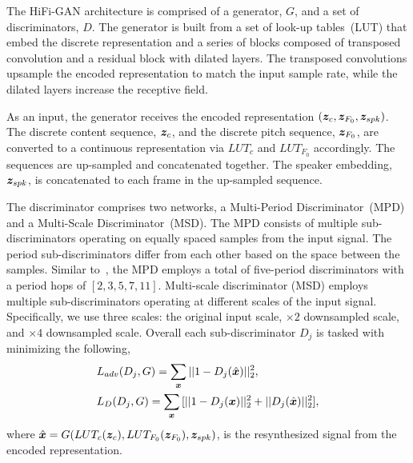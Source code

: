 The HiFi-GAN architecture is comprised of a generator, $G$, and a set of discriminators, $D$. The generator is built from a set of look-up tables~(LUT) that embed the discrete representation and a series of blocks composed of transposed convolution and a residual block with dilated layers. The transposed convolutions upsample the encoded representation to match the input sample rate, while the dilated layers increase the 
receptive field. 

As an input, the generator receives the encoded representation $(\bm{z}_c, \bm{z}_{F_0}, \bm{z}_{spk})$. The discrete content sequence, $\bm{z}_c$, and the discrete pitch sequence, $\bm{z}_{F_0}$, are converted to a continuous representation via $LUT_{c}$ and $LUT_{F_0}$ accordingly. The sequences are up-sampled and concatenated together. The speaker embedding, $\bm{z}_{spk}$, is concatenated to each frame in the up-sampled sequence.  

The discriminator comprises two networks, a Multi-Period Discriminator~(MPD) and a Multi-Scale Discriminator~(MSD). The MPD consists of multiple sub-discriminators operating on equally spaced samples from the input signal. The period sub-discriminators differ from each other based on the space between the samples. Similar to~\cite{kong2020hifi}, the MPD employs a total of five-period discriminators with a period hops of $[2, 3, 5, 7, 11]$. Multi-scale discriminator (MSD) employs multiple sub-discriminators operating at different scales of the input signal. Specifically, we use three scales: the original input scale, $\times2$ downsampled scale, and $\times4$ downsampled scale. Overall each sub-discriminator $D_j$ is tasked with minimizing the following,
\begin{equation}
\label{eq:discriminator}
\begin{aligned}
    &L_{adv}(D_j, G) = \sum_{\bm{x}}|| 1 - D_j(\hat{\bm{x}}) ||_2^2, \\
    &L_D(D_j, G) = \sum_{\bm{x}}{[|| 1 - D_j(\bm{x}) ||_2^2 + || D_j(\hat{\bm{x}}) ||_2^2]},
\end{aligned}
\end{equation}
where $\hat{\bm{x}}=G(LUT_{c}(\bm{z}_c), LUT_{F_0}(\bm{z}_{F_0}), \bm{z}_{spk})$, is the resynthesized signal from the encoded representation.

